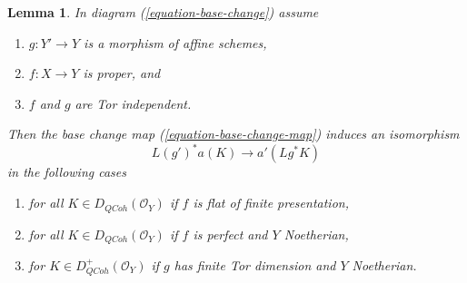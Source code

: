 \documentclass{amsart}
\theoremstyle{plain}
\newtheorem{lemma}[subsection]{Lemma}
\theoremstyle{definition}
\theoremstyle{remark}
\numberwithin{equation}{subsection}
\def\QCoh{\mathit{QCoh}}
\begin{document}
\begin{lemma}
\label{lemma-more-base-change}
In diagram (\ref{equation-base-change}) assume
\begin{enumerate}
\item $g : Y' \to Y$ is a morphism of affine schemes,
\item $f : X \to Y$ is proper, and
\item $f$ and $g$ are Tor independent.
\end{enumerate}
Then the base change map (\ref{equation-base-change-map}) induces an
isomorphism
$$
L(g')^*a(K) \longrightarrow a'(Lg^*K)
$$
in the following cases
\begin{enumerate}
\item for all $K \in D_\QCoh(\mathcal{O}_Y)$ if $f$
is flat of finite presentation,
\item for all $K \in D_\QCoh(\mathcal{O}_Y)$ if $f$
is perfect and $Y$ Noetherian,
\item for $K \in D_\QCoh^+(\mathcal{O}_Y)$ if $g$ has finite Tor dimension
and $Y$ Noetherian.
\end{enumerate}
\end{lemma}
\end{document}

